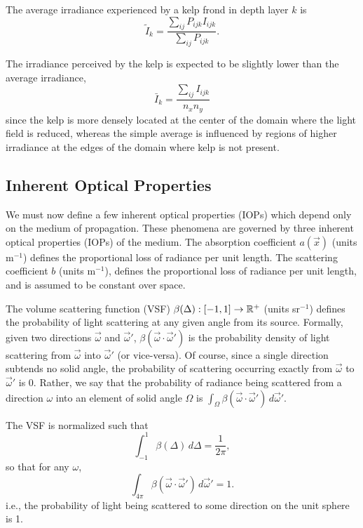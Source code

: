 The average irradiance experienced by a kelp frond in depth layer $k$ is
\newcommand{\Iperk}{\tilde{I}_k}
\begin{equation*}
   \Iperk = \frac{\sum_{ij}P_{ijk}I_{ijk}}{\sum_{ij}P_{ijk}}.
\end{equation*}

The irradiance perceived by the kelp is expected to be slightly lower than the average irradiance,
\begin{equation*}
  \bar{I}_k = \frac{\sum_{ij}I_{ijk}}{n_x n_y}
\end{equation*}
since the kelp is more densely located at the center of the domain where the light field is reduced,
whereas the simple average is influenced by regions of higher irradiance at the edges of the domain where kelp is not present.

\subsection{Inherent Optical Properties}
We must now define a few inherent optical properties (IOPs) which depend only on the medium of propagation.
These phenomena are governed by three inherent optical properties (IOPs) of the
medium.
The absorption coefficient $a(\vec{x})$ (units m$^{-1}$) defines the
proportional loss of radiance per unit length.
The scattering coefficient $b$ (units m$^{-1}$), defines the proportional loss
of radiance per unit length, and is assumed to be constant over space.

The volume scattering function (VSF) $\beta(\Delta): [-1, 1] \to \mathbb{R}^+$ (units sr$^{-1}$) defines the probability of light scattering at any given angle from its source.
Formally, given two directions $\vec{\omega}$ and $\vec{\omega}'$, $\beta(\vec{\omega} \cdot \vec{\omega}')$ is the probability density of light scattering from $\vec{\omega}$ into $\vec{\omega}'$ (or vice-versa).
Of course, since a single direction subtends no solid angle, the probability of scattering occurring exactly from $\vec{\omega}$ to $\vec{\omega}'$ is 0.
Rather, we say that the probability of radiance being scattered from a direction $\omega$ into an element of solid angle $\Omega$ is $\int_\Omega \beta(\vec{\omega} \cdot \vec{\omega}')\, d\vec{\omega}'$.

The VSF is normalized such that
\begin{equation*}
  \int_{-1}^1\beta(\Delta)\, d\Delta=\frac{1}{2\pi},
\end{equation*}
so that for any $\omega$,
\begin{equation*}
  \int_{4\pi}\beta(\vec{\omega}\cdot\vec{\omega}')\, d\vec{\omega}' = 1.
\end{equation*}
i.e., the probability of light being scattered to some direction on the unit sphere is 1.


